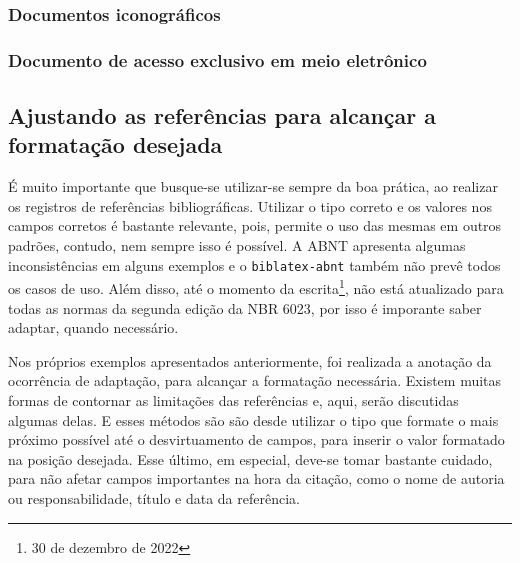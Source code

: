 


\subsubsection{Documentos iconográficos}



\subsubsection{Documento de acesso exclusivo em meio eletrônico}



\subsection{Ajustando as referências para alcançar a formatação desejada}
É muito importante que busque-se utilizar-se sempre da boa prática, ao realizar os registros de referências bibliográficas. Utilizar o tipo correto e os valores nos campos corretos é bastante relevante, pois, permite o uso das mesmas em outros padrões, contudo, nem sempre isso é possível. A ABNT apresenta algumas inconsistências em alguns exemplos e o \texttt{biblatex-abnt} também não prevê todos os casos de uso. Além disso, até o momento da escrita\footnote{30 de dezembro de 2022}, não está atualizado para todas as normas da segunda edição da NBR 6023, por isso é imporante saber adaptar, quando necessário. 

Nos próprios exemplos apresentados anteriormente, foi realizada a anotação da ocorrência de adaptação, para alcançar a formatação necessária. Existem muitas formas de contornar as limitações das referências e, aqui, serão discutidas algumas delas. E esses métodos são são desde utilizar o tipo que formate o mais próximo possível até o desvirtuamento de campos, para inserir o valor formatado na posição desejada. Esse último, em especial, deve-se tomar bastante cuidado, para não afetar campos importantes na hora da citação, como o nome de autoria ou responsabilidade, título e data da referência.

